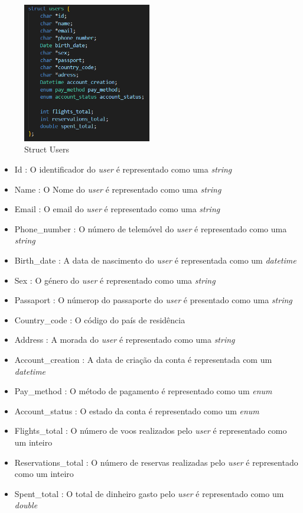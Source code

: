 \documentclass[11pt]{article}
\begin{document}
    \begin{figure}[hbt!]
        \centering
        \includegraphics[width=0.5\textwidth]{users.png}
        \caption{Struct Users}
        \label{fig:example}
    \end{figure}
    \newpage
     \begin{itemize}
                \item Id : O identificador do \textit{user} é representado como uma \textit{string}
                \item Name : O Nome do \textit{user} é representado como uma \textit{string}
                \item Email : O email do \textit{user} é representado como uma \textit{string}
                \item Phone_number : O número de telemóvel do \textit{user} é representado como uma \textit{string}
                \item Birth_date : A data de nascimento do \textit{user} é representada como um \textit{datetime}
                \item Sex : O género do \textit{user} é representado como uma \textit{string}
                \item Passaport : O númerop do passaporte do \textit{user} é presentado como uma \textit{string}
                \item Country_code : O código do país de residência
                \item Address : A morada do \textit{user} é representado como uma \textit{string}
                \item Account_creation : A data de criação da conta é representada com um \textit{datetime}
                \item Pay_method : O método de pagamento é representado como um \textit{enum} 
                \item Account_status : O estado da conta é representado como um \textit{enum} 
                \item Flights_total : O número de voos realizados pelo \textit{user} é representado como um inteiro
                \item Reservations_total : O número de reservas realizadas pelo \textit{user} é representado como um inteiro
                \item Spent_total : O total de dinheiro gasto pelo \textit{user} é representado como um \textit{double}
        \end{itemize}
\newpage
\end{document}
